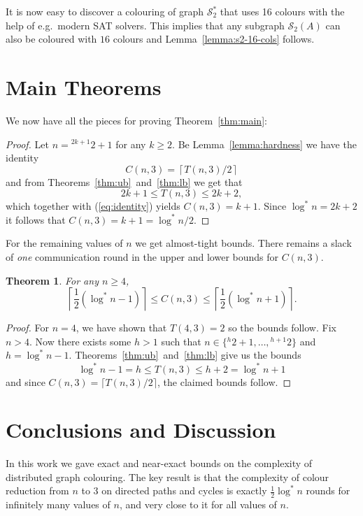 \documentclass[a4paper,11pt]{article}
\newtheorem{theorem}{Theorem}
\theoremstyle{remark}
\newcommand{\cS}{\mathcal{S}}
\newcommand{\logst}{\log^{*}}
\newcommand{\pt}[1]{{}^{#1}2} \newcommand{\nh}{\sim} \DeclareMathOperator{\indeg}{in-deg}
\begin{document}
It is now easy to discover a colouring of graph $\cS_2^*$ that uses 16 colours with the help of e.g.\ modern SAT solvers. This implies that any subgraph $\cS_2(A)$ can also be coloured with $16$ colours and Lemma~\ref{lemma:s2-16-cols} follows.

\section{Main Theorems}

We now have all the pieces for proving Theorem~\ref{thm:main}:

\mainthm* 
\begin{proof}
Let $n = \pt{2k+1} + 1$ for any $k \ge 2$. Be Lemma~\ref{lemma:hardness} we have the identity
\begin{equation}
\label{eq:identity}
 C(n , 3) = \left \lceil T(n,3)/2 \right \rceil
\end{equation}
and from Theorems~\ref{thm:ub}~and~\ref{thm:lb} we get that
\[
 2k+1 \le T(n ,3) \le 2k+2,
\]
which together with (\ref{eq:identity}) yields $C(n,3) = k+1$. Since $\logst n = 2k+2$ it follows that $C(n,3) = k+1 = \logst n / 2$.
\end{proof}

For the remaining values of $n$ we get almost-tight bounds. There remains a slack of \emph{one} communication round in the upper and lower bounds for $C(n,3)$.

\begin{theorem}
 For any $n \ge 4$, 
 \[
  \left \lceil \frac{1}{2} \left( \logst n -1 \right) \right \rceil \le C(n,3) \le \left\lceil \frac{1}{2} \left( \logst n + 1 \right) \right\rceil.
 \]
\end{theorem}
\begin{proof}
 For $n=4$, we have shown that $T(4,3) = 2$ so the bounds follow. Fix $n > 4$. Now there exists some $h > 1$ such that $n \in \{\pt{h} + 1, \dots, \pt{h+1}\}$ and $h = \logst n - 1$. Theorems~\ref{thm:ub}~and~\ref{thm:lb} give us the bounds
\[
 \logst n - 1 = h \le T(n,3) \le h+2 = \logst n + 1
\]
and since $C(n,3) = \lceil T(n,3)/2 \rceil$, the claimed bounds follow.
\end{proof} 


\section{Conclusions and Discussion}

In this work we gave exact and near-exact bounds on the complexity of distributed graph colouring. The key result is that the complexity of colour reduction from $n$ to $3$ on directed paths and cycles is exactly $\frac{1}{2}\logst n$ rounds for infinitely many values of $n$, and very close to it for all values of $n$.
\end{document}
